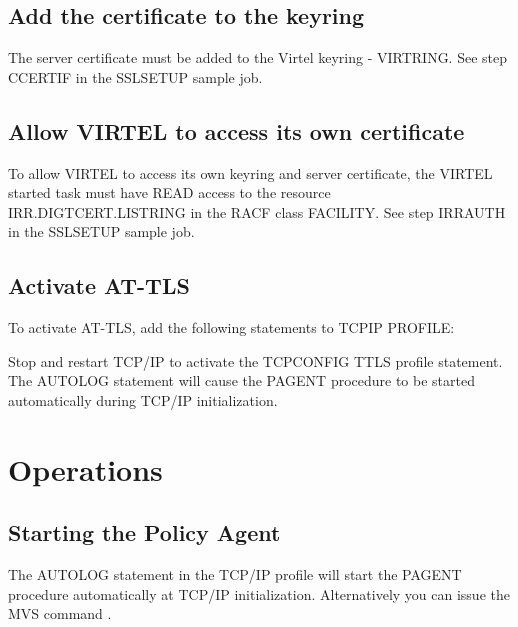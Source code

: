 \documentclass[letterpaper,10pt,english]{sphinxmanual}
\begin{document}
\subsection{Add the certificate to the keyring}
\label{\detokenize{connectivity_guide:add-the-certificate-to-the-keyring}}
The server certificate must be added to the Virtel keyring - VIRTRING. See step CCERTIF in the SSLSETUP sample job.


\subsection{Allow VIRTEL to access its own certificate}
\label{\detokenize{connectivity_guide:allow-virtel-to-access-its-own-certificate}}
To allow VIRTEL to access its own keyring and server certificate, the VIRTEL started task must have READ access to the resource IRR.DIGTCERT.LISTRING in the RACF class FACILITY. See step IRRAUTH in the SSLSETUP sample job.


\subsection{Activate AT-TLS}
\label{\detokenize{connectivity_guide:activate-at-tls}}
To activate AT-TLS, add the following statements to TCPIP PROFILE:

\begin{sphinxVerbatim}[commandchars=\\\{\}]
 
   
\end{sphinxVerbatim}

Stop and restart TCP/IP to activate the TCPCONFIG TTLS profile statement. The AUTOLOG statement will cause the PAGENT procedure to be started automatically during TCP/IP initialization.

\newpage

\ignorespaces 

\section{Operations}
\label{\detokenize{connectivity_guide:operations}}\label{\detokenize{connectivity_guide:index-158}}

\subsection{Starting the Policy Agent}
\label{\detokenize{connectivity_guide:starting-the-policy-agent}}
The AUTOLOG statement in the TCP/IP profile will start the PAGENT procedure automatically at TCP/IP initialization. Alternatively you can issue the MVS command .
\end{document}
